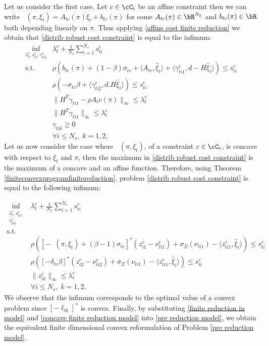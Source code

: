 \documentclass[11pt,a4paper,oneside,openany]{book}
\DeclareMathOperator{\C}{C_{tc}}
\numberwithin{definition}{section}
\numberwithin{theorem}{section}
\numberwithin{problem}{section}
\begin{document}
Let us consider the first case. Let $c \in \cC_t$ be an affine constraint then we can write $\C(\pi,\xi_t) = A_{tc}(\pi)\xi_t + b_{tc}(\pi)$ for some $A_{tc}(\pi) \in \bR^{N_{\xi}}$ and $b_{tc}(\pi) \in \bR$ both depending linearly on $\pi$. Thus applying \eqref{affine cost finite reduction} we obtain that \eqref{distrib robust cost constraint} is equal to the infimum:
\begin{equation} \label{finite reduction in model}
\begin{aligned}
    \inf_{\lambda_{t}^c,s_{ti}^c,\gamma_{tik}^c} & \lambda^c_t + \frac{1}{N_s}\sum_{i=1}^{N_s}s_{ti}^c \\
    \text{s.t.} \; \; &
    \rho(b_{tc}(\pi)+ (1-\beta)\sigma_{tc} + \langle A_{tc}, \hat \xi_t \rangle + \langle \gamma_{ti1}^c ,  d - H \hat \xi_i \rangle) \leq s_{ti}^c \\
    & \rho (-\sigma_{tc}\beta  + \langle \gamma_{ti2}^c ,  d . H \hat \xi_i \rangle) \leq s_{ti}^c \\
    & \|H^T\gamma_{ti1} - \rho A_tc(\pi)\|_{\infty} \leq \lambda_t^c \\
    & \|H^T\gamma_{ti1} \|_{\infty} \leq \lambda_t^c \\
    & \gamma_{tik} \geq 0  \\
    & \forall i \leq N_s,\; k = 1,2,
\end{aligned}
\end{equation}
Let us now consider the case where $\C(\pi,\xi_t)$, of a constraint $c \in \cC_t$, is concave with respect to $\xi_t$ and $\pi$, then the maximum in \eqref{distrib robust cost constraint} is the maximum of a concave and an affine function. Therefore, using Theorem \ref{finiteconvexprogramfinitereduction}, problem \eqref{distrib robust cost constraint} is equal to the following infimum:

\begin{align}
\label{concave finite reduction model}
\inf_{\substack{\lambda_{t}^c, s_{ti}^c, \\\gamma_{tik}^c}} & \lambda^c_t + \frac{1} {N_s}\sum_{i=1}^{N_s} s_{ti}^c  \\
\text{s.t.} \nonumber \\
& \rho\left( \left[-\C(\pi,\xi_t) + (\beta-1)\sigma_{tc}\right]^*(z_{i1}^c - \nu_{ti1}^c) + \sigma_{\Xi}(\nu_{ti1}) - \langle z_{ti1}^c, \hat \xi_i \rangle \right) \leq s_{ti}^c \nonumber \\
& \rho\left([-\delta_{tc}\beta]^*(z_{i2}^c - \nu_{ti2}^c) + \sigma_{\Xi}(\nu_{ti1}) - \langle z_{ti1}^c, \hat \xi_i \rangle \right) \leq s_{ti}^c  \nonumber\\
& \|z_{ik}^c\|_{\infty} \leq \lambda_t^c \nonumber \\
& \forall i \leq N_s,\; k  =1, 2. \nonumber
\end{align}
We observe that the infimum corresponds to the optimal value of a convex problem since $[-\ell_{tk}]^*$ is convex. Finally, by substituting \eqref{finite reduction in model} and \eqref{concave finite reduction model} into \eqref{pre reduction model}, we obtain the equivalent finite dimensional convex reformulation of Problem \ref{pre reduction model}.
\end{document}
